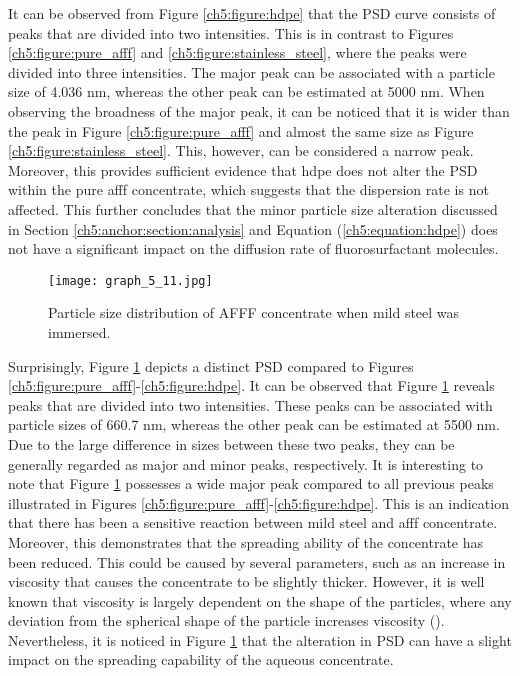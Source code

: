 It can be observed from Figure \ref{ch5:figure:hdpe} that the PSD curve consists of peaks that are divided into two intensities. This is in contrast to Figures \ref{ch5:figure:pure_afff} and \ref{ch5:figure:stainless_steel}, where the peaks were divided into three intensities. The major peak can be associated with a particle size of 4.036 nm, whereas the other peak can be estimated at 5000 nm. When observing the broadness of the major peak, it can be noticed that it is wider than the peak in Figure \ref{ch5:figure:pure_afff} and almost the same size as Figure \ref{ch5:figure:stainless_steel}. This, however, can be considered a narrow peak. Moreover, this provides sufficient evidence that \acrshort{hdpe} does not alter the PSD within the pure \acrshort{afff} concentrate, which suggests that the dispersion rate is not affected. This further concludes that the minor particle size alteration discussed in Section \ref{ch5:anchor:section:analysis} and Equation (\ref{ch5:equation:hdpe}) does not have a significant impact on the diffusion rate of fluorosurfactant molecules.  
  
\begin{figure}[H]
    \centering
    \texttt{[image: graph\_5\_11.jpg]}
    \caption{Particle size distribution of AFFF concentrate when mild steel was immersed.}
    \label{ch5:figure:mild_steel}
\end{figure}

Surprisingly, Figure \ref{ch5:figure:mild_steel} depicts a distinct PSD compared to Figures \ref{ch5:figure:pure_afff}-\ref{ch5:figure:hdpe}. It can be observed that Figure \ref{ch5:figure:mild_steel} reveals peaks that are divided into two intensities. These peaks can be associated with particle sizes of 660.7 nm, whereas the other peak can be estimated at 5500 nm. Due to the large difference in sizes between these two peaks, they can be generally regarded as major and minor peaks, respectively. It is interesting to note that Figure \ref{ch5:figure:mild_steel} possesses a wide major peak compared to all previous peaks illustrated in Figures \ref{ch5:figure:pure_afff}-\ref{ch5:figure:hdpe}. This is an indication that there has been a sensitive reaction between mild steel and \acrshort{afff} concentrate. Moreover, this demonstrates that the spreading ability of the concentrate has been reduced. This could be caused by several parameters, such as an increase in viscosity that causes the concentrate to be slightly thicker. However, it is well known that viscosity is largely dependent on the shape of the particles, where any deviation from the spherical shape of the particle increases viscosity (\cite{karau1997influence}). Nevertheless, it is noticed in Figure \ref{ch5:figure:mild_steel} that the alteration in PSD can have a slight impact on the spreading capability of the aqueous concentrate. 

